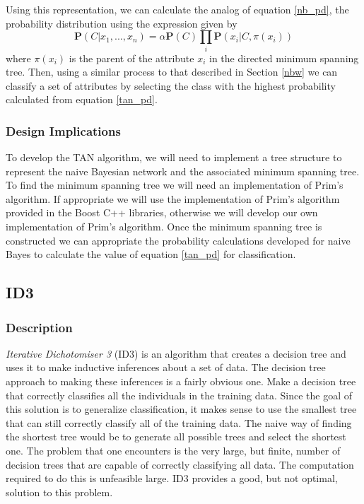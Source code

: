 \documentclass{article}
\newcommand{\ve}[1]{\boldsymbol{\mathbf{#1}}}
\begin{document}
				Using this representation, we can calculate the analog of equation \ref{nb_pd}, the probability distribution using the expression given by \cite{Zheng2010}
				\begin{equation}
						\ve{P}(C|x_1,...,x_n) = \alpha \ve{P}(C) \prod_i \ve{P}(x_i| C, \pi(x_i)) \label{tan_pd}
				\end{equation}
				where $\pi(x_i)$ is the parent of the attribute $x_i$ in the directed minimum spanning tree. 
				Then, using a similar process to that described in Section \ref{nbw} we can classify a set of attributes by selecting the class with the highest probability calculated from equation \ref{tan_pd}.
			\subsubsection{Design Implications}
				To develop the TAN algorithm, we will need to implement a tree structure to represent the naive Bayesian network and the associated minimum spanning tree. 
				To find the minimum spanning tree we will need an implementation of Prim's algorithm.
				If appropriate we will use the implementation of Prim's algorithm provided in the Boost C++ libraries, otherwise we will develop our own implementation of Prim's algorithm. 
				Once the minimum spanning tree is constructed we can appropriate the probability calculations developed for naive Bayes to calculate the value of equation \ref{tan_pd} for classification.
		\subsection{ID3}
			\subsubsection{Description}
				\textit{Iterative Dichotomiser 3} (ID3) is an algorithm that creates a decision tree and uses it to make inductive inferences about a set of data.
				The decision tree approach to making these inferences is a fairly obvious one.
				Make a decision tree that correctly classifies all the individuals in the training data.
				Since the goal of this solution is to generalize classification, it makes sense to use the smallest tree that can still correctly classify all of the training data.
				The naive way of finding the shortest tree would be to generate all possible trees and select the shortest one\cite{Quinlan1986}.
				The problem that one encounters is the very large, but finite, number of decision trees that are capable of correctly classifying all data.
				The computation required to do this is unfeasible large.
				ID3 provides a good, but not optimal, solution to this problem.
		
\end{document}
